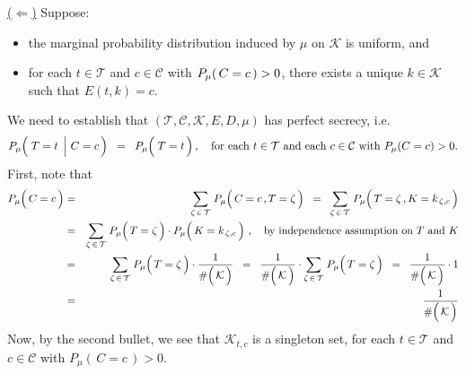 \vskip 0.2cm
\noindent
\underline{($\Longleftarrow$)}
\vskip 0.2cm
\noindent
Suppose:
\begin{itemize}
\item
	the marginal probability distribution induced by $\mu$ on $\mathcal{K}$ is uniform, and
\item
	for each $t \in \mathcal{T}$ and $c \in \mathcal{C}$
	with $P_{\mu}\!\left(\,C \overset{{\color{white}.}}{=} c\,\right) > 0$,
	there exists a unique $k \in \mathcal{K}$
	such that $E(t,k) = c$.
\end{itemize}
We need to establish that $(\mathcal{T},\mathcal{C},\mathcal{K},E,D,\mu)$
has perfect secrecy, i.e.
\begin{equation*}
P_{\mu}\!\left(\,\left. T \overset{{\color{white}-}}{=} t \;\,\right\vert\, C = c \,\right)
\;\; = \;\;
	P_{\mu}\!\left(\; T \overset{{\color{white}-}}{=} t \,\right),
\quad
\textnormal{for each $t \in \mathcal{T}$ and each $c \in \mathcal{C}$ with $P_{\mu}\!\left(C = c\right) > 0$}.
\end{equation*}
First, note that
\begin{eqnarray*}
P_{\mu}\!\left(\, C \overset{{\color{white}1}}{=} c \,\right)
& = &
	\underset{\zeta\,\in\,\mathcal{T}}{\sum}\;
	P_{\mu}\!\left(\, C \overset{{\color{white}1}}{=} c \,, T = \zeta \,\right)
\;\; = \;\;
	\underset{\zeta\,\in\,\mathcal{T}}{\sum}\;
	P_{\mu}\!\left(\, T \overset{{\color{white}1}}{=} \zeta \,, K = k_{\,\zeta,c} \,\right)
\\
& = &
	\underset{\zeta\,\in\,\mathcal{T}}{\sum}\;
	P_{\mu}\!\left(\, T \overset{{\color{white}1}}{=} \zeta \,\right)
	\cdot
	P_{\mu}\!\left(\, K \overset{{\color{white}1}}{=} k_{\,\zeta,c} \,\right)\,,
	\quad
	\textnormal{by independence assumption on $T$ and $K$}
\\
& = &
	\underset{\zeta\,\in\,\mathcal{T}}{\sum}\;
	P_{\mu}\!\left(\, T \overset{{\color{white}1}}{=} \zeta \,\right)
	\cdot
	\dfrac{1}{\#\!\left(\,\overset{{\color{white}.}}{\mathcal{K}}\,\right)}
\;\; = \;\;
	\dfrac{1}{\#\!\left(\,\overset{{\color{white}.}}{\mathcal{K}}\,\right)}
	\cdot
	\underset{\zeta\,\in\,\mathcal{T}}{\sum}\;
	P_{\mu}\!\left(\, T \overset{{\color{white}1}}{=} \zeta \,\right)
\;\; = \;\;
	\dfrac{1}{\#\!\left(\,\overset{{\color{white}.}}{\mathcal{K}}\,\right)} \cdot 1
\\
& = &
	\dfrac{1}{\#\!\left(\,\overset{{\color{white}.}}{\mathcal{K}}\,\right)}
\end{eqnarray*}
Now, by the second bullet, we see that $\mathcal{K}_{t,c}$ is a singleton set,
for each $t \in \mathcal{T}$ and $c \in \mathcal{C}$ with $P_{\mu}\!\left(\,C = c\,\right) > 0$.
